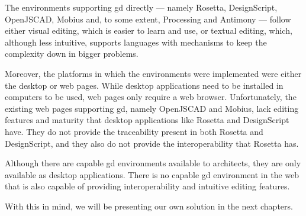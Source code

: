 The environments supporting \gls{gd} directly --- namely Rosetta, DesignScript, OpenJSCAD, Mobius and, to some extent, Processing and Antimony --- follow either visual editing, which is easier to learn and use, or textual editing, which, although less intuitive, supports languages with mechanisms to keep the complexity down in bigger problems.

Moreover, the platforms in which the environments were implemented were either the desktop or web pages.
While desktop applications need to be installed in computers to be used, web pages only require a web browser.
Unfortunately, the existing web pages supporting \gls{gd}, namely OpenJSCAD and Mobius, lack editing features and maturity that desktop applications like Rosetta and DesignScript have.
They do not provide the traceability present in both Rosetta and DesignScript, and they also do not provide the interoperability that Rosetta has.

Although there are capable \gls{gd} environments available to architects, they are only available as desktop applications.
There is no capable \gls{gd} environment in the web that is also capable of providing interoperability and intuitive editing features.

With this in mind, we will be presenting our own solution in the next chapters.






